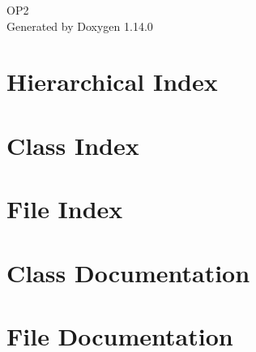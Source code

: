 \documentclass[twoside]{book}
\newcommand{\+}{\discretionary{\mbox{\scriptsize$\hookleftarrow$}}{}{}}
\newcommand{\clearemptydoublepage}{%
    \newpage{\pagestyle{empty}\cleardoublepage}%
  }
\begin{document}
  \raggedbottom
    \hypersetup{pageanchor=false,
                bookmarksnumbered=true,
                pdfencoding=unicode
               }
  \begin{titlepage}
  \vspace*{7cm}
  \begin{center}%
  {\Large OP2}\\
  \vspace*{1cm}
  {\large Generated by Doxygen 1.14.0}\\
  \end{center}
  \end{titlepage}
  \clearemptydoublepage
  \tableofcontents
  \clearemptydoublepage
  \hypersetup{pageanchor=true}

\chapter{Hierarchical Index}

\chapter{Class Index}

\chapter{File Index}

\chapter{Class Documentation}


\chapter{File Documentation}










  \backmatter
  \newpage
  \clearemptydoublepage
  \printindex
\end{document}
